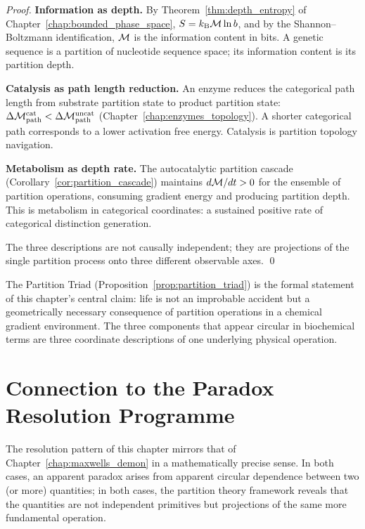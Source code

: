 \begin{proof}
\noindent\textbf{Information as depth.} By Theorem~\ref{thm:depth_entropy}
of Chapter~\ref{chap:bounded_phase_space}, $S = k_{\mathrm{B}} \mathcal{M} \ln b$, and by
the Shannon--Boltzmann identification, $\mathcal{M}$ is the information content in
bits. A genetic sequence is a partition of nucleotide sequence space; its
information content is its partition depth.

\noindent\textbf{Catalysis as path length reduction.} An enzyme reduces the
categorical path length from substrate partition state to product partition
state: $\Delta\mathcal{M}_{\mathrm{path}}^{\mathrm{cat}} < \Delta\mathcal{M}_{\mathrm{path}}^{\mathrm{uncat}}$
(Chapter~\ref{chap:enzymes_topology}). A shorter categorical path corresponds
to a lower activation free energy. Catalysis is partition topology navigation.

\noindent\textbf{Metabolism as depth rate.} The autocatalytic partition cascade
(Corollary~\ref{cor:partition_cascade}) maintains $d\mathcal{M}/dt > 0$ for the
ensemble of partition operations, consuming gradient energy and producing
partition depth. This is metabolism in categorical coordinates: a sustained
positive rate of categorical distinction generation.

The three descriptions are not causally independent; they are projections of
the single partition process onto three different observable axes. \qed
\end{proof}

The Partition Triad (Proposition~\ref{prop:partition_triad}) is the formal
statement of this chapter's central claim: life is not an improbable accident
but a geometrically necessary consequence of partition operations in a chemical
gradient environment. The three components that appear circular in biochemical
terms are three coordinate descriptions of one underlying physical operation.

\section{Connection to the Paradox Resolution Programme}
\label{sec:paradox_programme}

The resolution pattern of this chapter mirrors that of Chapter~\ref{chap:maxwells_demon}
in a mathematically precise sense. In both cases, an apparent paradox arises
from apparent circular dependence between two (or more) quantities; in both
cases, the partition theory framework reveals that the quantities are not
independent primitives but projections of the same more fundamental operation.

